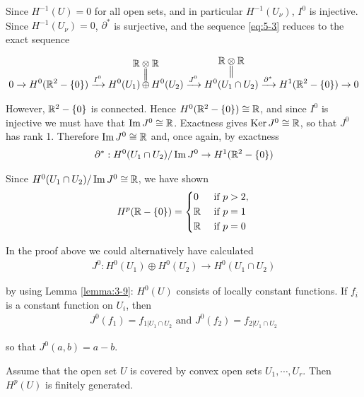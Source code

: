 Since $H^{-1}(U) = 0$ for all open sets, and in particular $H^{-1}(U_\nu)$, $I^0$ is
injective. Since $H^{-1}(U_\nu) = 0$, $\partial^*$ is surjective, and the sequence \eqref{eq:5-3} reduces to
the exact sequence

\begin{align*}
  0\lr{} H^0(\RR^2-\{0\})\lr{I^0} H^0(U_1)
  \hspace*{-1em}\overset{\substack{\displaystyle\RR\otimes\RR\\\big|\!\big|}}{\oplus}\hspace*{-1em} 
  H^0(U_2)\lr{J^0} 
  \overset{\substack{\displaystyle\RR\otimes\RR\\\big|\!\big|}}{H^0(U_1\cap U_2)}
  \lr{\partial^*}H^1(\RR^2-\{0\})\lr{} 0
\end{align*}

However, $\mathbb{R}^2-\{0\}$ is connected. Hence $H^0(\mathbb{R}^2-\{0\}) \cong \mathbb{R}$, and since $I^0$ is 
injective we must have that $\operatorname{Im} J^0\cong\mathbb{R}$. Exactness gives $\operatorname{Ker} J^0\cong\mathbb{R}$, so that $J^0$
has rank 1. Therefore $\operatorname{Im} J^0\cong \mathbb{R}$ and, once again, by exactness
\begin{align*}
  \partial^*: H^0(U_1\cap U_2)/\operatorname{Im} J^0 \to H^1(\mathbb{R}^2-\{0\})
\end{align*}

Since $H^0(U_1\cap U_2)/\operatorname{Im} J^0\cong \mathbb{R}$, we have shown
\begin{align*}
  H^p(\mathbb{R} - \{0\}) = \left\{\begin{aligned}
    & 0 && \text{ if } p>2,\\
    & \mathbb{R} && \text{ if } p = 1 \\
    & \mathbb{R} && \text{ if } p = 0
  \end{aligned}\right.
\end{align*}

In the proof above we could alternatively have calculated
\begin{align*}
  J^0:H^0(U_1)\oplus H^0(U_2)\to H^0(U_1\cap U_2)
\end{align*}

by using Lemma \ref{lemma:3-9}: $H^0(U)$ consists of locally constant functions. If $f_i$ is a
constant function on $U_i$, then
\begin{align*}
  J^0(f_1) = f_{1|U_1\cap U_2} \text{ and } J^0(f_2) = f_{2|U_1\cap U_2}
\end{align*}

so that $J^0(a, b) = a - b$.

\begin{theorem}\label{theorem:5-5}
  Assume that the open set $U$ is covered by convex open sets $U_1, \cdots, U_r$. Then $H^p(U)$ is finitely generated.
\end{theorem}

